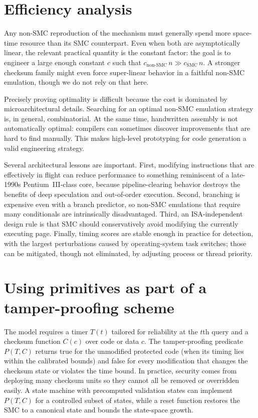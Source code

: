 \documentclass[11pt]{article}
\begin{document}
\section{Efficiency analysis}\label{sec:efficiency}

Any non-SMC reproduction of the mechanism must generally spend more space-time
resource than its SMC counterpart.  Even when both are asymptotically linear, the
relevant practical quantity is the constant factor: the goal is to engineer a
large enough constant $c$ such that
$c_{\text{non-SMC}}\,n \gg c_{\text{SMC}}\,n$.  A
stronger checksum family might even force super-linear behavior in a faithful
non-SMC emulation, though we do not rely on that here.

Precisely proving optimality is difficult because the cost is dominated by
microarchitectural details.  Searching for an optimal non-SMC emulation strategy
is, in general, combinatorial.  At the same time, handwritten assembly is not
automatically optimal: compilers can sometimes discover improvements that are
hard to find manually.  This makes high-level prototyping for code generation a
valid engineering strategy.

Several architectural lessons are important.  First, modifying instructions that
are effectively in flight can reduce performance to something reminiscent of a
late-1990s Pentium~III-class core, because pipeline-clearing behavior destroys the
benefits of deep speculation and out-of-order execution.  Second, branching is
expensive even with a branch predictor, so non-SMC emulations that require many
conditionals are intrinsically disadvantaged.  Third, an ISA-independent design
rule is that SMC should conservatively avoid modifying the currently executing
page.  Finally, timing scores are stable enough in practice for detection, with
the largest perturbations caused by operating-system task switches; those can be
mitigated, though not eliminated, by adjusting process or thread priority.

\section{Using primitives as part of a tamper-proofing scheme}\label{sec:using-primitives}

The model requires a timer $T(t)$ tailored for reliability at the $t$th query and
a checksum function $C(c)$ over code or data $c$.  The tamper-proofing predicate
$P(T,C)$ returns true for the unmodified protected code (when its timing lies within the calibrated bounds) and false for every modification that changes the checksum state or violates the time bound.
In practice, security comes from deploying many checksum units so they cannot all
be removed or overridden easily.  A state machine with precomputed validation
states can implement $P(T,C)$ for a controlled subset of states, while a reset
function restores the SMC to a canonical state and bounds the state-space growth.
\end{document}
